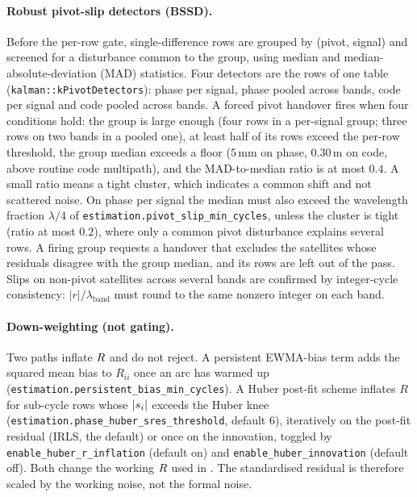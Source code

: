 \documentclass[main.tex]{subfiles}
\begin{document}
\paragraph{Robust pivot-slip detectors (BSSD).}
Before the per-row gate, single-difference rows are grouped by
(pivot, signal) and screened for a disturbance common to the group, using
median and median-absolute-deviation (MAD) statistics.  Four detectors are
the rows of one table (\texttt{kalman::kPivotDetectors}): phase per signal,
phase pooled across bands, code per signal and code pooled across bands.  A
forced pivot handover fires when four conditions hold: the group is large
enough (four rows in a per-signal group; three rows on two bands in a pooled
one), at least half of its rows exceed the per-row threshold, the group
median exceeds a floor ($5\,\mathrm{mm}$ on phase, $0.30\,\mathrm{m}$ on code,
above routine code multipath), and the MAD-to-median ratio is at most $0.4$.
A small ratio means a tight cluster, which indicates a common shift and not
scattered noise.  On phase per signal the median must also exceed the
wavelength fraction $\lambda/4$ of \texttt{estimation.pivot\_slip\_min\_cycles},
unless the cluster is tight (ratio at most $0.2$), where only a common pivot
disturbance explains several rows.  A firing group requests a handover that
excludes the satellites whose residuals disagree with the group median, and
its rows are left out of the pass.  Slips on non-pivot satellites across
several bands are confirmed by integer-cycle consistency:
$|r|/\lambda_{\mathrm{band}}$ must round to the same nonzero integer on
each band.

\paragraph{Down-weighting (not gating).}
Two paths inflate $R$ and do not reject.  A persistent EWMA-bias term
adds the squared mean bias to $R_{ii}$ once an arc has warmed up
(\texttt{estimation.persistent\_bias\_min\_cycles}).  A
Huber post-fit scheme inflates $R$ for sub-cycle rows whose $|s_i|$
exceeds the Huber knee (\texttt{estimation.phase\_huber\_sres\_threshold},
default $6$), iteratively on the post-fit residual (IRLS, the default) or
once on the innovation, toggled by
\texttt{enable\_huber\_r\_inflation} (default on) and
\texttt{enable\_huber\_innovation} (default off).  Both change the working $R$ used
in .  The standardised residual is therefore
scaled by the working noise, not the formal noise.
\end{document}
